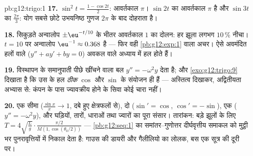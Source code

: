 \begin{solution}{pb:g12:trigo:1}
\textbf{17.} $\sin^2 t = \frac{1 - \cos 2t}{2}$: आवर्तकाल $\pi$। $\sin 2t$ का आवर्तकाल $\pi$ है और $\sin 3t$ का
$\frac{2\pi}{3}$: योग सबसे छोटे उभयनिष्ठ गुणज $2\pi$ के बाद दोहराता है।

\textbf{18.} सिकुड़ते अन्वालोप $\pm\eu^{-t/10}$ के भीतर आवर्तकाल $1$ का दोलन: हर झूला
लगभग $10\,\%$ नीचा। $t = 10$ पर अन्वालोप $\eu^{-1} \approx 0.368$ है --- फिर वही \cref{pb:g12:exp:1} वाला अचर। ऐसे
अवमंदित हलों वाले  ($y'' + a y' + b y = 0$) अवकल  वाले अध्याय में हल होते हैं।

\textbf{19.} विस्थापन के समानुपाती पीछे खींचने वाला बल $y'' = -\omega^2 y$ देता है; और \cref{exo:g12:trigo:9}
दिखाता है कि उस  के हल \emph{ठीक} $\cos$ और $\sin$ के संयोजन ही हैं ---
अस्तित्व दिखाकर, अद्वितीयता अभ्यास से: कंपन के पास ज्यावक्रीय होने के सिवा
कोई चारा नहीं।

\textbf{20.} एक सीमा ($\frac{\sin x}{x} \to 1$, दबे हुए क्षेत्रफलों से), दो  ($\sin' = \cos$, $\cos' = -\sin$),
एक  ($y'' = -\omega^2 y$), और घड़ियों, तारों, धाराओं तथा ज्वारों का पूरा संसार।
तारांकन: बड़े झूलों के लिए $T = 4\sqrt{\frac Lg} \cdot
\frac{\pi/2}{M(1, \cos(\theta_0/2))}$ --- \cref{pb:g12:seq:1} का समांतर--गुणोत्तर 
दीर्घवृत्तीय समाकल को मुट्ठी भर पुनरावृत्तियों में निकाल देता है: गाउस की
डायरी और गैलीलियो का लोलक, बस एक सूत्र की दूरी पर।
\end{solution}
